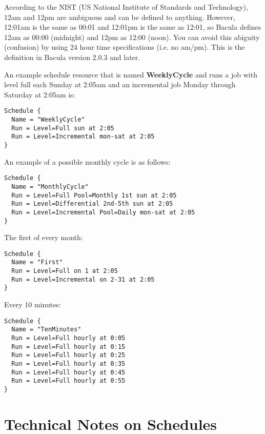 According to the NIST (US National Institute of Standards and Technology),
12am and 12pm are ambiguous and can be defined to anything.  However,
12:01am is the same as 00:01 and 12:01pm is the same as 12:01, so Bacula
defines 12am as 00:00 (midnight) and 12pm as 12:00 (noon).  You can avoid
this abiguity (confusion) by using 24 hour time specifications (i.e.  no
am/pm). This is the definition in Bacula version 2.0.3 and later.

An example schedule resource that is named {\bf WeeklyCycle} and runs a job
with level full each Sunday at 2:05am and an incremental job Monday through
Saturday at 2:05am is: 

\footnotesize
\begin{verbatim}
Schedule {
  Name = "WeeklyCycle"
  Run = Level=Full sun at 2:05
  Run = Level=Incremental mon-sat at 2:05
}
\end{verbatim}
\normalsize

An example of a possible monthly cycle is as follows: 

\footnotesize
\begin{verbatim}
Schedule {
  Name = "MonthlyCycle"
  Run = Level=Full Pool=Monthly 1st sun at 2:05
  Run = Level=Differential 2nd-5th sun at 2:05
  Run = Level=Incremental Pool=Daily mon-sat at 2:05
}
\end{verbatim}
\normalsize

The first of every month: 

\footnotesize
\begin{verbatim}
Schedule {
  Name = "First"
  Run = Level=Full on 1 at 2:05
  Run = Level=Incremental on 2-31 at 2:05
}
\end{verbatim}
\normalsize

Every 10 minutes: 

\footnotesize
\begin{verbatim}
Schedule {
  Name = "TenMinutes"
  Run = Level=Full hourly at 0:05
  Run = Level=Full hourly at 0:15
  Run = Level=Full hourly at 0:25
  Run = Level=Full hourly at 0:35
  Run = Level=Full hourly at 0:45
  Run = Level=Full hourly at 0:55
}
\end{verbatim}
\normalsize

\section{Technical Notes on Schedules}

